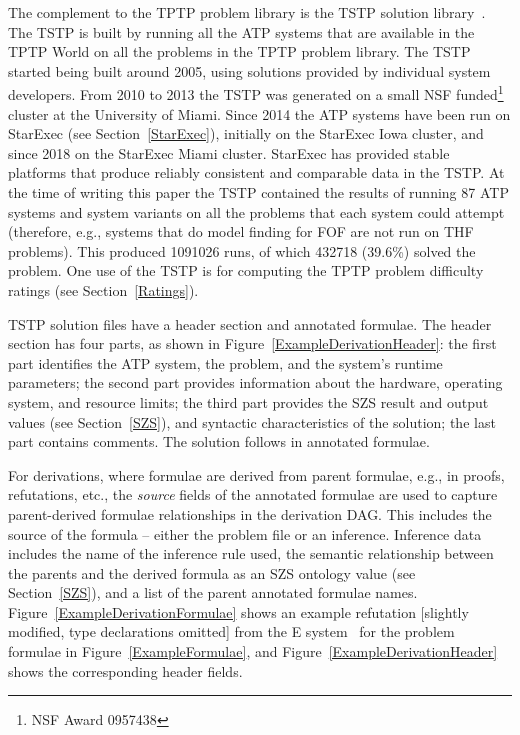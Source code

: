 \documentclass[runningheads]{llncs}
\begin{document}
The complement to the TPTP problem library is the TSTP solution library~\cite{Sut07-CSR,Sut10}.
The TSTP is built by running all the ATP systems that are available in the TPTP World on
all the problems in the TPTP problem library.
The TSTP started being built around 2005, using solutions provided by individual system developers.
From 2010 to 2013 the TSTP was generated on a small NSF funded\footnote{%
NSF Award 0957438} cluster at the University of Miami.
Since 2014 the ATP systems have been run on StarExec (see Section~\ref{StarExec}), initially on 
the StarExec Iowa cluster, and since 2018 on the StarExec Miami cluster.
StarExec has provided stable platforms that produce reliably consistent and comparable data in 
the TSTP.
At the time of writing this paper the TSTP contained the results of running 87 ATP systems and 
system variants on all the problems that each system could attempt
(therefore, e.g., systems that do model finding for FOF are not run on THF problems).
This produced 1091026 runs, of which 432718 (39.6\%) solved the problem.
One use of the TSTP is for computing the TPTP problem difficulty ratings (see 
Section~\ref{Ratings}).

TSTP solution files have a header section and annotated formulae.
The header section has four parts, as shown in Figure~\ref{ExampleDerivationHeader}:
the first part identifies the ATP system, the problem, and the system's runtime parameters; 
the second part provides information about the hardware, operating system, and resource limits; 
the third part provides the SZS result and output values (see Section~\ref{SZS}), and syntactic 
characteristics of the solution; the last part contains comments.
The solution follows in annotated formulae.

For derivations, where formulae are derived from parent formulae, e.g., in proofs, refutations, 
etc., the {\em source} fields of the annotated formulae are used to capture parent-derived 
formulae relationships in the derivation DAG.
This includes the source of the formula -- either the problem file or an inference.
Inference data includes the name of the inference rule used, the semantic relationship between 
the parents and the derived formula as an SZS ontology value (see Section~\ref{SZS}), and a 
list of the parent annotated formulae names.
Figure~\ref{ExampleDerivationFormulae} shows an example refutation [slightly modified, type
declarations omitted] from the E system~\cite{SCV19} for the problem formulae in 
Figure~\ref{ExampleFormulae}, and Figure~\ref{ExampleDerivationHeader} shows the corresponding 
header fields.
\end{document}
